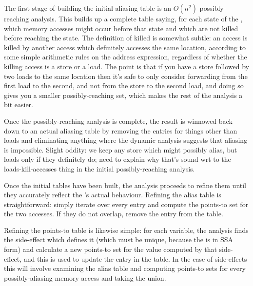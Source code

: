 The first stage of building the initial aliasing table is an $O(n^2)$
possibly-reaching analysis.  This builds up a complete table saying,
for each state of the {\StateMachine}, which memory accesses might
occur before that state and which are not killed before reaching the
state.  The definition of killed is somewhat subtle: an access is
killed by another access which definitely accesses the same location,
according to some simple arithmetic rules on the address expression,
regardless of whether the killing access is a store or a load.  The
point is that if you have a store followed by two loads to the same
location then it's safe to only consider forwarding from the first
load to the second, and not from the store to the second load, and
doing so gives you a smaller possibly-reaching set, which makes the
rest of the analysis a bit easier.

Once the possibly-reaching analysis is complete, the result is
winnowed back down to an actual aliasing table by removing the entries
for things other than loads and eliminating anything where the dynamic
analysis suggests that aliasing is impossible.  
Slight oddity: we keep any store which might possibly alias, but loads
only if they definitely do; need to explain why that's sound wrt to
the loads-kill-accesses thing in the initial possibly-reaching
analysis.


Once the initial tables have been built, the analysis proceeds to
refine them until they accurately reflect the {\StateMachine}'s actual
behaviour.  Refining the alias table is straightforward: simply
iterate over every entry and compute the points-to set for the two
accesses.  If they do not overlap, remove the entry from the table.

Refining the points-to table is likewise simple: for each variable,
the analysis finds the side-effect which defines it (which must be
unique, because the {\StateMachine} is in SSA form) and calculate a
new points-to set for the value computed by that side-effect, and this
is used to update the entry in the table.  In the case of 
side-effects this will involve examining the alias table and computing
points-to sets for every possibly-aliasing memory access and taking
the union.

